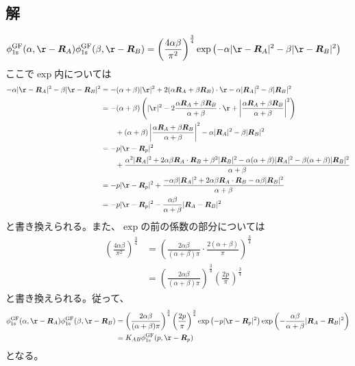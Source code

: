 \subsection{解}
\begin{align}
	\phi^{\rm GF}_{\rm 1s}(\alpha,\r-\bm{R}_A)
	\phi^{\rm GF}_{\rm 1s}(\beta,\r-\bm{R}_B)
&=
	\left(
		\frac{
			4\alpha\beta
		}{
			\pi^2
		}
	\right)^{\frac{3}{4}}
	\exp\left(
		-\alpha|\r-\bm{R}_A|^2
		-\beta|\r-\bm{R}_B|^2
	\right)
\end{align}
ここで$\exp$内については
\begin{align}
	-
	\alpha|\r-\bm{R}_A|^2
	-
	\beta|\r-\bm{R}_B|^2
&=
	-
	(\alpha+\beta)|\r|^2
	+
	2(\alpha\bm{R}_A+\beta\bm{R}_B)\cdot\r
	-
	\alpha|\bm{R}_A|^2
	-
	\beta|\bm{R}_B|^2 \\
%
%
&=
	-
	(\alpha+\beta)
	\left(
		|\r|^2
		-
		2
		\frac{\alpha\bm{R}_A+\beta\bm{R}_B}{\alpha+\beta}\cdot\r
		+
		\left|
			\frac{\alpha\bm{R}_A+\beta\bm{R}_B}{\alpha+\beta}
		\right|^2
	\right) \nonumber \\&\qquad
	+
	(\alpha+\beta)
	\left|
		\frac{\alpha\bm{R}_A+\beta\bm{R}_B}{\alpha+\beta}
	\right|^2
	-
	\alpha|\bm{R}_A|^2
	-
	\beta|\bm{R}_B|^2 \\
%
%
&=
	-
	p|\r-\bm{R}_p|^2 \nonumber \\&\qquad
	+
	\frac{
		\alpha^2|\bm{R}_A|^2
		+
		2\alpha\beta\bm{R}_A\cdot\bm{R}_B
		+
		\beta^2|\bm{R}_B|^2
		-
		\alpha(\alpha+\beta)|\bm{R}_A|^2
		-
		\beta(\alpha+\beta)|\bm{R}_B|^2
	}{
		\alpha+\beta
	} \\
%
%
&=
	-
	p|\r-\bm{R}_p|^2
	+
	\frac{
		-
		\alpha\beta|\bm{R}_A|^2
		+
		2\alpha\beta\bm{R}_A\cdot\bm{R}_B
		-
		\alpha\beta|\bm{R}_B|^2
	}{
		\alpha+\beta
	} \\
%
%
&=
	-
	p|\r-\bm{R}_p|^2
	-
	\frac{\alpha\beta}{\alpha+\beta}
	|\bm{R}_A-\bm{R}_B|^2
\end{align}
と書き換えられる。また、$\exp$の前の係数の部分については
\begin{align}
	\left(
		\frac{4\alpha\beta}{\pi^2}
	\right)^{\frac{3}{4}}
&=
	\left(
		\frac{2\alpha\beta}{(\alpha+\beta)\pi}\cdot
		\frac{2(\alpha+\beta)}{\pi}
	\right)^{\frac{3}{4}} \\
%
%
&=
	\left(
		\frac{2\alpha\beta}{(\alpha+\beta)\pi}
	\right)^{\frac{3}{4}}
	\left(
		\frac{2p}{\pi}
	\right)^{\frac{3}{4}}
\end{align}
と書き換えられる。従って、
\begin{align}
	\phi^{\rm GF}_{\rm 1s}(\alpha,\r-\bm{R}_A)
	\phi^{\rm GF}_{\rm 1s}(\beta,\r-\bm{R}_B)
&=
	\left(
		\frac{2\alpha\beta}{(\alpha+\beta)\pi}
	\right)^{\frac{3}{4}}
	\left(
		\frac{2p}{\pi}
	\right)^{\frac{3}{4}}
	\exp\left(
		-p|\r-\bm{R}_p|^2
	\right)
	\exp\left(
		-\frac{\alpha\beta}{\alpha+\beta}|\bm{R}_A-\bm{R}_B|^2
	\right) \\
%
%
&=
	K_{AB}
	\phi^{\rm GF}_{\rm 1s}(p,\r-\bm{R}_p)
\end{align}
となる。

